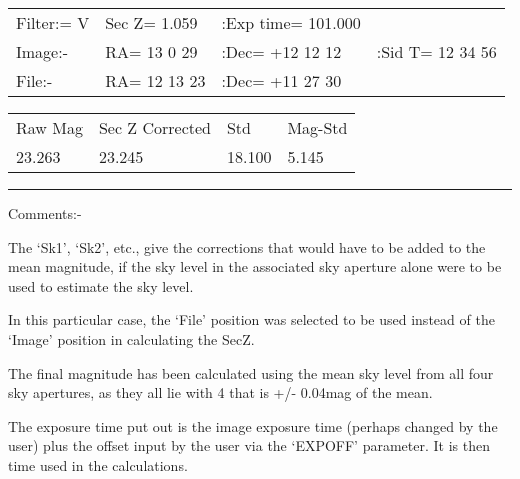 {{\hspace{3ex}\begin{tabular}{llll}
  Filter:= V &Sec Z= 1.059  &:Exp time= 101.000 & \\
  Image:-    &RA= 13  0 29  & :Dec= +12 12 12   &:Sid T= 12 34 56 \\
   File:-    &RA= 12 13 23  & :Dec= +11 27 30   & \\
\end{tabular}

\hspace{3ex}\begin{tabular}{llll}
  Raw Mag    & Sec Z Corrected    & Std    & Mag-Std \\
      23.263 &   23.245         & 18.100   & 5.145 \\
\end{tabular}

\rule{5in}{0.2mm}

  Comments:- 

  \begin{list}{{-}}{}
   \item The `Sk1', `Sk2', etc., give the corrections that would have to be
      added to the mean magnitude, if the sky level in the associated
      sky aperture alone were to be used to estimate the sky level.
    \item In this particular case, the `File' position was selected to be
      used instead of the `Image' position in calculating the SecZ.
    \item The final magnitude has been calculated using the mean sky
      level from all four sky apertures, as they all lie with 4%
      that is +/- 0.04mag of the mean.
    \item The exposure time put out is the image exposure time (perhaps
      changed by the user) plus the offset input by the user via the
      `EXPOFF' parameter. It is then time used in the calculations.
   \end{list}

}}
